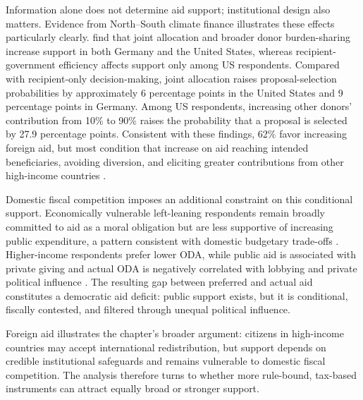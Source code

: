 \documentclass[11pt,a4paper]{article}
\begin{document}
Information alone does not determine aid support; institutional design also matters. Evidence from North--South climate finance illustrates these effects particularly clearly. \citet{gampfer_obtaining_2014} find that joint allocation and broader donor burden-sharing increase support in both Germany and the United States, whereas recipient-government efficiency affects support only among US respondents. %
Compared with recipient-only decision-making, joint allocation raises proposal-selection probabilities by approximately 6 percentage points in the United States and 9 percentage points in Germany. Among US respondents, increasing other donors' contribution from 10\% to 90\% raises the probability that a proposal is selected by 27.9 percentage points. 
Consistent with these findings, 62\% %
favor increasing foreign aid, but most condition that increase on aid reaching intended beneficiaries, avoiding diversion, and eliciting greater contributions from other high-income countries \citep{fabre_majority_2025}. %

Domestic fiscal competition imposes an additional constraint on this conditional support. Economically vulnerable left-leaning respondents remain broadly committed to aid as a moral obligation but are less supportive of increasing public expenditure, a pattern consistent with domestic budgetary trade-offs \citep{cho_ideology_2024}. %
Higher-income respondents prefer lower ODA, while public aid is associated with private giving and actual ODA is negatively correlated with lobbying and private political influence \citep{kaufmann_foreign_2019}. The resulting gap between preferred and actual aid constitutes a democratic aid deficit: public support exists, but it is conditional, fiscally contested, and filtered through unequal political influence.

Foreign aid illustrates the chapter's broader argument: citizens in high-income countries may accept international redistribution, but support depends on credible institutional safeguards and remains vulnerable to domestic fiscal competition. The analysis therefore turns to whether more rule-bound, tax-based instruments can attract equally broad or stronger support.
\end{document}

